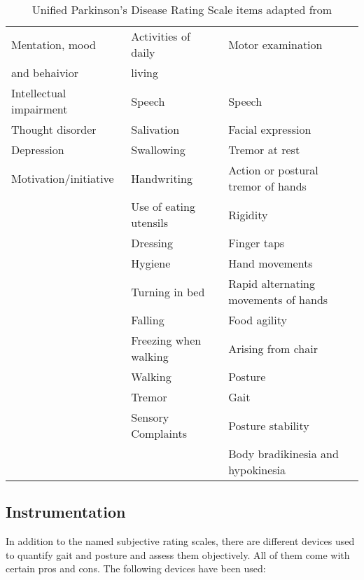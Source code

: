 \begin{table}[h]
\begin{tabular}{lll}
\hline
Mentation, mood & Activities of daily & Motor examination \\
and behaivior & living & \\
\hline
Intellectual impairment & Speech & Speech \\

Thought disorder & Salivation & Facial expression\\

Depression & Swallowing & Tremor at rest \\

Motivation/initiative & Handwriting & Action or postural tremor of hands \\

& Use of eating utensils & Rigidity \\

& Dressing & Finger taps\\

& Hygiene & Hand movements\\

& Turning in bed & Rapid alternating movements of hands\\

& Falling & Food agility\\

& Freezing when walking & Arising from chair \\

& Walking & Posture\\

& Tremor & Gait\\

& Sensory Complaints & Posture stability\\

& & Body bradikinesia and hypokinesia \\
\hline
\end{tabular}
\label{tab:UPDRS}
\caption{Unified Parkinson's Disease Rating Scale items adapted from \cite{herndon_handbook_2006}}
\end{table}

\subsection{Instrumentation}

In addition to the named subjective rating scales, there are different devices used to quantify gait and posture and assess them objectively. All of them come with certain pros and cons. The following devices have been used:

